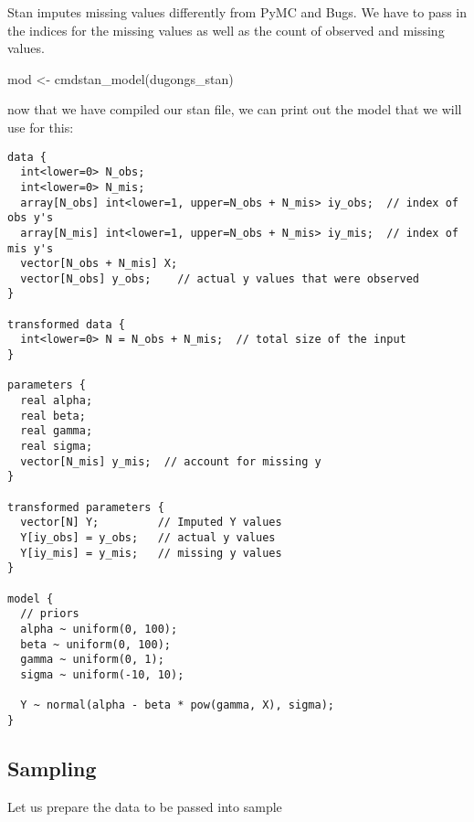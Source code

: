\documentclass[
  letterpaper,
  DIV=11,
  numbers=noendperiod]{scrreprt}
\newenvironment{Shaded}{\begin{snugshade}}{\end{snugshade}}
\newcommand{\FunctionTok}[1]{\textcolor[rgb]{0.28,0.35,0.67}{#1}}
\newcommand{\NormalTok}[1]{\textcolor[rgb]{0.00,0.23,0.31}{#1}}
\newcommand{\OtherTok}[1]{\textcolor[rgb]{0.00,0.23,0.31}{#1}}
\newcommand{\SpecialCharTok}[1]{\textcolor[rgb]{0.37,0.37,0.37}{#1}}
\begin{document}
Stan imputes missing values differently from PyMC and Bugs. We have to
pass in the indices for the missing values as well as the count of
observed and missing values.

\begin{Shaded}
\begin{Highlighting}[]
\NormalTok{mod }\OtherTok{\textless{}{-}} \FunctionTok{cmdstan\_model}\NormalTok{(dugongs\_stan)}
\end{Highlighting}
\end{Shaded}

now that we have compiled our stan file, we can print out the model that
we will use for this:

\begin{Shaded}
\end{Shaded}

\begin{verbatim}
data {
  int<lower=0> N_obs;
  int<lower=0> N_mis;
  array[N_obs] int<lower=1, upper=N_obs + N_mis> iy_obs;  // index of obs y's
  array[N_mis] int<lower=1, upper=N_obs + N_mis> iy_mis;  // index of mis y's
  vector[N_obs + N_mis] X;
  vector[N_obs] y_obs;    // actual y values that were observed
}

transformed data {
  int<lower=0> N = N_obs + N_mis;  // total size of the input
}

parameters {
  real alpha;
  real beta;
  real gamma;
  real sigma;
  vector[N_mis] y_mis;  // account for missing y
}

transformed parameters {
  vector[N] Y;         // Imputed Y values
  Y[iy_obs] = y_obs;   // actual y values
  Y[iy_mis] = y_mis;   // missing y values
}

model {
  // priors
  alpha ~ uniform(0, 100);
  beta ~ uniform(0, 100);
  gamma ~ uniform(0, 1);
  sigma ~ uniform(-10, 10);
  
  Y ~ normal(alpha - beta * pow(gamma, X), sigma);
}
\end{verbatim}

\hypertarget{sampling-1}{%
\subsection*{Sampling}\label{sampling-1}}

Let us prepare the data to be passed into sample
\end{document}

